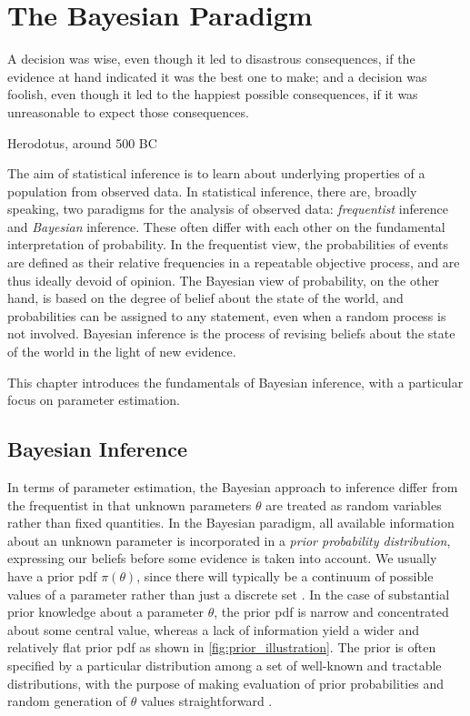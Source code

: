 \chapter{The Bayesian Paradigm}\label{chap:bayesian}

\epigraph{A decision was wise, even though it led to disastrous consequences, if the evidence at hand indicated it was the best one to make; and a decision was foolish, even though it led to the happiest possible consequences, if it was unreasonable to expect those consequences.}{Herodotus, around 500 BC}


The aim of statistical inference is to learn about underlying properties of a population from observed data.  In statistical inference, there are, broadly speaking, two paradigms for the analysis of observed data: \textit{frequentist} inference and \textit{Bayesian} inference. These often differ with each other on the fundamental interpretation of probability. In the frequentist view, the probabilities of events are defined as their relative frequencies in a repeatable objective process, and are thus ideally devoid of opinion. The Bayesian view of probability, on the other hand, is based on the degree of belief about the state of the world, and probabilities can be assigned to any statement, even when a random process is not involved. Bayesian inference is the process of revising beliefs about the state of the world in the light of new evidence.   

This chapter introduces the fundamentals of Bayesian inference, with a particular focus on parameter estimation.




\section{Bayesian Inference}\label{sec:bayes_paradigm}

In terms of parameter estimation, the Bayesian approach to inference differ from the frequentist in that unknown parameters $\theta$ are treated as random variables rather than fixed quantities. In the Bayesian paradigm, all available information about an unknown parameter is incorporated in a \textit{prior probability distribution}, expressing our beliefs before some evidence is taken into account. We usually have a prior pdf $\pi(\theta)$, since there will typically be a continuum of possible values of a parameter rather than just a discrete set \cite[p. 758, 776]{STK}. In the case of substantial prior knowledge about a parameter $\theta$, the prior pdf is narrow and concentrated about some central value, whereas a lack of information yield a wider and relatively flat prior pdf as shown in \autoref{fig:prior_illustration}. The prior is often specified by a particular distribution among a set of well-known and tractable distributions, with the purpose of making evaluation of prior probabilities and random generation of $\theta$ values straightforward \cite{ABCprimer}.

